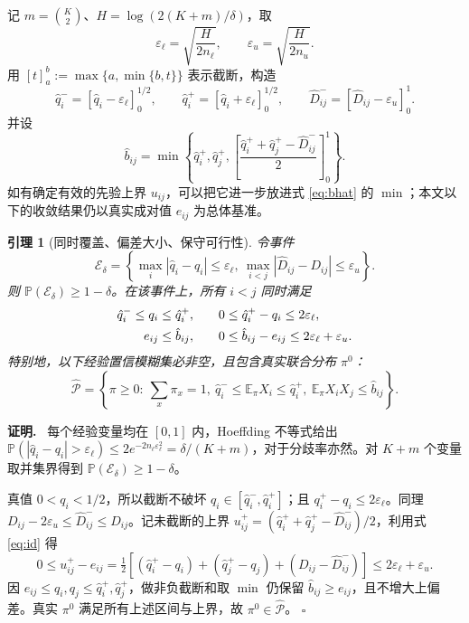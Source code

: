 \documentclass[11pt,a4paper]{ctexart}
\newtheorem{lemma}[theorem]{引理}
\theoremstyle{definition}
\newenvironment{proofcn}{\par\noindent\textbf{证明.}\ }{\hfill$\square$\par}
\newcommand{\calP}{\mathcal P}
\newcommand{\Pp}{\mathbb P}
\newcommand{\Ee}{\mathbb E}
\newcommand{\epsl}{\varepsilon_{\ell}}
\newcommand{\epsu}{\varepsilon_u}
\begin{document}
记 $m=\binom K2$、$H=\log(2(K+m)/\delta)$，取
\begin{equation}\label{eq:eps}
\epsl=\sqrt{\frac{H}{2n_\ell}},\qquad\epsu=\sqrt{\frac{H}{2n_u}}.
\end{equation}
用 $[t]_a^b:=\max\{a,\min\{b,t\}\}$ 表示截断，构造
\begin{equation}\label{eq:intervals}
\hat q_i^-=[\hat q_i-\epsl]_0^{1/2},\qquad
\hat q_i^+=[\hat q_i+\epsl]_0^{1/2},\qquad
\hat D_{ij}^-=[\hat D_{ij}-\epsu]_0^1.
\end{equation}
并设
\begin{equation}\label{eq:bhat}
\hat b_{ij}=\min\left\{\hat q_i^+,\hat q_j^+,\left[\frac{\hat q_i^++\hat q_j^+-\hat D_{ij}^-}{2}\right]_0^1\right\}.
\end{equation}
如有确定有效的先验上界 $u_{ij}$，可以把它进一步放进式 \eqref{eq:bhat} 的 $\min$；本文以下的收敛结果仍以真实成对值 $e_{ij}$ 为总体基准。

\begin{lemma}[同时覆盖、偏差大小、保守可行性]\label{lem:coverage}
令事件
\[
\mathcal E_\delta=\left\{\max_i|\hat q_i-q_i|\le\epsl,\ \max_{i<j}|\hat D_{ij}-D_{ij}|\le\epsu\right\}.
\]
则 $\Pp(\mathcal E_\delta)\ge1-\delta$。在该事件上，所有 $i<j$ 同时满足
\begin{align}\label{eq:bounds}
\hat q_i^-\le q_i\le\hat q_i^+,&\qquad0\le \hat q_i^+-q_i\le2\epsl,\\
e_{ij}\le\hat b_{ij},&\qquad 0\le \hat b_{ij}-e_{ij}\le2\epsl+\epsu.\notag
\end{align}
特别地，以下经验置信模糊集必非空，且包含真实联合分布 $\pi^0$：
\begin{equation}\label{eq:Phat}
\widehat{\calP}=\left\{\pi\ge0:\ \sum_x\pi_x=1,\ \hat q_i^-\le\Ee_\pi X_i\le\hat q_i^+,\ \Ee_\pi X_iX_j\le\hat b_{ij}\right\}.
\end{equation}
\end{lemma}
\begin{proofcn}
每个经验变量均在 $[0,1]$ 内，Hoeffding 不等式给出 $\Pp(|\hat q_i-q_i|>\epsl)\le2e^{-2n_\ell\epsl^2}=\delta/(K+m)$，对于分歧率亦然。对 $K+m$ 个变量取并集界得到 $\Pp(\mathcal E_\delta)\ge1-\delta$。

真值 $0<q_i<1/2$，所以截断不破坏 $q_i\in[\hat q_i^-,\hat q_i^+]$；且 $q_i^+-q_i\le2\epsl$。同理 $D_{ij}-2\epsu\le\hat D_{ij}^-\le D_{ij}$。记未截断的上界 $u_{ij}^+=(\hat q_i^++\hat q_j^+-\hat D_{ij}^-)/2$，利用式 \eqref{eq:id} 得
\[
0\le u_{ij}^+-e_{ij}=\tfrac12\left[(\hat q_i^+-q_i)+(\hat q_j^+-q_j)+(D_{ij}-\hat D_{ij}^-)\right]\le2\epsl+\epsu.
\]
因 $e_{ij}\le q_i,q_j\le\hat q_i^+,\hat q_j^+$，做非负截断和取 $\min$ 仍保留 $\hat b_{ij}\ge e_{ij}$，且不增大上偏差。真实 $\pi^0$ 满足所有上述区间与上界，故 $\pi^0\in\widehat{\calP}$。
\end{proofcn}
\end{document}
